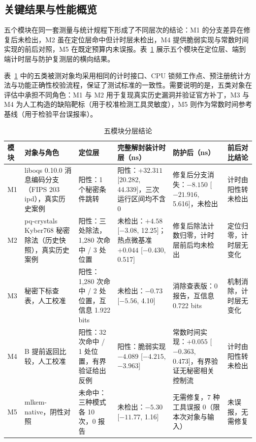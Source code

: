 \subsection{关键结果与性能概览}

五个模块在同一套测量与统计规程下形成了不同层次的结论：M1 的分支差异在修复后未检出，M2 虽在定位层命中但计时层未检出，M4 提供脆弱实现与常数时间实现的前后对照，M5 在既定预算内未误报。表~\ref{tab:modules} 展示五个模块在定位层、端到端计时层与防护复测层的横向结果。

表~\ref{tab:modules} 中的五类被测对象均采用相同的计时接口、CPU 锁频工作点、预注册统计方法与功能正确性校验流程，保证了测试标准的一致性。需要说明的是，五类对象在评估中承担不同角色：M1 与 M2 用于复现真实历史漏洞并验证官方补丁，M3 与 M4 为人工构造的缺陷靶标（用于校准检测工具灵敏度），M5 则作为常数时间参考基线（用于检验平台误报率）。

\begin{table}[H]
\centering
\caption{五模块分层结论}
\label{tab:modules}
{\footnotesize
\begin{tabularx}{\textwidth}{|>{\raggedright\arraybackslash}p{0.8cm}|>{\raggedright\arraybackslash}p{3.6cm}|>{\raggedright\arraybackslash}p{2.7cm}|>{\raggedright\arraybackslash}p{3.1cm}|>{\raggedright\arraybackslash}p{2.9cm}|>{\raggedright\arraybackslash}X|}
\hline
模块 & 对象与角色 & 定位层 & 完整解封装计时层（ns） & 防护后（ns） & 前后对比结论 \\
\hline
M1 & liboqs 0.10.0 消息编码分支（FIPS 203 ipd），真实历史案例 & 阳性：1 个秘密条件跳转 & 阳性：$+32.311$ [20.282, 44.339]，三次运行区间均不含 0 & 修复后分支消失：$-8.150$ [$-21.916$, 5.616]，未检出 & 计时由阳性转未检出 \\
\hline
M2 & pq-crystals Kyber768 秘密除法（历史快照），真实历史案例 & 阳性：三处除法，1,280 次命中 / 3 处位置 & 未检出：$+4.58$ [$-3.08$, 12.25]；热点微基准 $+0.044$ [$-0.430$, 0.517] & 修复后除法计数归零，计时层前后均未检出 & 定位归零，计时层无变化 \\
\hline
M3 & 秘密下标查表，人工校准 & 阳性：1,280 次命中 / 2 处位置，互信息 1.922 bits & 未检出：$-0.73$ [$-5.56$, 4.10] & 消除查表版：0 报告，互信息 0.722 bits & 机制消除，计时层无变化 \\
\hline
M4 & 32 B 提前返回比较，人工校准 & 阳性：32 次命中 / 1 处位置，有界验证给出反例 & 阳性：脆弱实现 $-4.089$ [$-4.215$, $-3.963$] & 常数时间实现：$+0.055$ [$-0.363$, 0.473]，有界验证无秘密相关控制流 & 计时由阳性转未检出 \\
\hline
M5 & mlkem-native，阴性对照 & 未命中：三种模式各 10 次，0 报告 & 未检出：$-5.30$ [$-11.77$, 1.16] & 无需修复，7 种工具误报 0（限本次对象与输入） & 未误报，无需修复 \\
\hline
\end{tabularx}
\par{}
}
\end{table}

